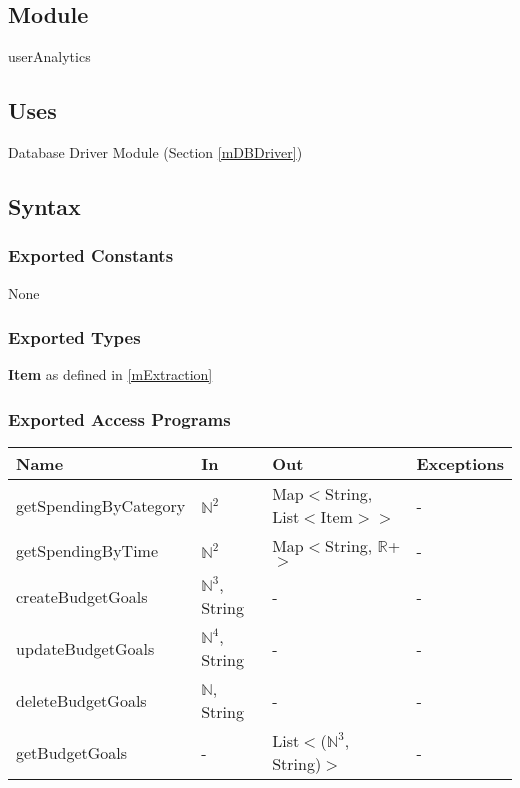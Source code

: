 \documentclass[12pt, titlepage]{article}
\begin{document}
\subsection{Module}

userAnalytics

\subsection{Uses}

Database Driver Module (Section \ref{mDBDriver})

\subsection{Syntax}

\subsubsection{Exported Constants}
None

\subsubsection{Exported Types}

\textbf{Item} as defined in \ref{mExtraction}

\subsubsection{Exported Access Programs}

\begin{center}

\begin{tabular}{p{5cm} p{3cm} p{4cm} p{4cm}}
\hline
\textbf{Name} & \textbf{In} & \textbf{Out} & \textbf{Exceptions} \\
\hline
getSpendingByCategory & $\mathbb{N}^2$ & Map$<$String, List$<$Item$>$$>$  & - \\
getSpendingByTime & $\mathbb{N}^2$ & Map$<$String, $\mathbb{R}$+$>$ & - \\
createBudgetGoals & $\mathbb{N}^3$, String & - & - \\
updateBudgetGoals & $\mathbb{N}^4$, String & - & - \\
deleteBudgetGoals & $\mathbb{N}$, String & - & - \\
getBudgetGoals & - & List$<$($\mathbb{N}^3$, String)$>$ & - \\
\hline
\end{tabular}
\end{center}
\end{document}
